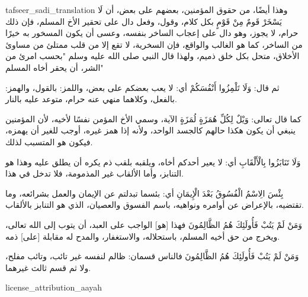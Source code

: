 \begin{taggedblock}{tafseer_sadi_translation}
وهذا أيضًا، من حقوق المؤمنين، بعضهم على بعض، أن
{ لَا يَسْخَرْ قَومٌ مِنْ قَوْمٍ }
بكل كلام، وقول، وفعل دال على تحقير الأخ المسلم، فإن ذلك حرام، لا يجوز، وهو دال على إعجاب الساخر بنفسه، وعسى أن يكون المسخور به خيرًا من الساخر، كما هو  الغالب والواقع، فإن السخرية، لا تقع إلا من قلب ممتلئ من مساوئ الأخلاق، متحل بكل خلق ذميم، ولهذا قال النبي صلى الله عليه وسلم
"بحسب امرئ من الشر، أن يحقر أخاه المسلم"

ثم قال:
{ وَلَا تَلْمِزُوا أَنْفُسَكُمْ }
أي: لا يعب بعضكم على بعض، واللمز: بالقول، والهمز: بالفعل، وكلاهما منهي عنه حرام، متوعد عليه بالنار.

كما قال تعالى:
{ وَيْلٌ لِكُلِّ هُمَزَةٍ لُمَزَةٍ }
الآية، وسمي الأخ المؤمن  نفسًا لأخيه، لأن المؤمنين ينبغي أن يكون هكذا حالهم كالجسد الواحد، ولأنه إذا همز غيره، أوجب للغير أن يهمزه، فيكون هو المتسبب لذلك.

{ وَلَا تَنَابَزُوا بِالْأَلْقَابِ }
أي: لا يعير أحدكم أخاه، ويلقبه بلقب ذم يكره أن يطلق عليه  وهذا هو التنابز، وأما الألقاب غير المذمومة، فلا تدخل في هذا.

{ بِئْسَ الِاسْمُ الْفُسُوقُ بَعْدَ الْإِيمَانِ }
أي: بئسما تبدلتم عن الإيمان والعمل بشرائعه، وما تقتضيه، بالإعراض عن أوامره ونواهيه، باسم الفسوق والعصيان، الذي هو التنابز بالألقاب.

{ وَمَنْ لَمْ يَتُبْ فَأُولَئِكَ هُمُ الظَّالِمُونَ }
فهذا
[هو]
الواجب على العبد، أن يتوب إلى الله تعالى، ويخرج من حق أخيه المسلم، باستحلاله، والاستغفار، والمدح له مقابلة
[على]
ذمه.

{ وَمَنْ لَمْ يَتُبْ فَأُولَئِكَ هُمُ الظَّالِمُونَ }
فالناس قسمان: ظالم لنفسه غير تائب، وتائب مفلح، ولا ثم قسم ثالث غيرهما.
\end{taggedblock}
\begin{taggedblock}{license_attribution_aayah}

\end{taggedblock}
\begin{comment}
Please use the following for footnotes:- Sample\footnoteQ{Text of Qur'an footnote goes here.}.
Sample\footnoteT{Text of Tafseer footnote goes here.}.
\end{comment}